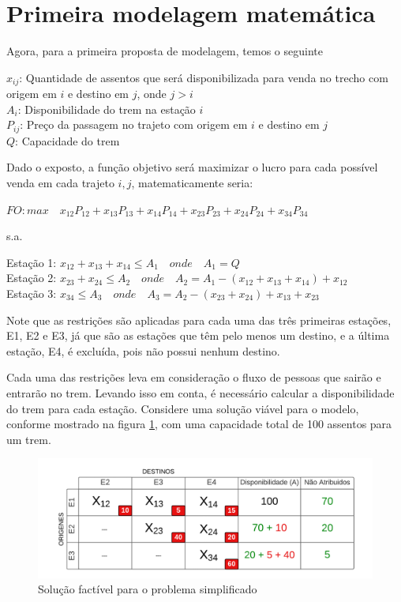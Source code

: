 \section{Primeira modelagem matemática}\label{sec:modelo1}

Agora, para a primeira proposta de modelagem, temos o seguinte

\noindent $x_{ij}$: Quantidade de assentos que será disponibilizada para venda no trecho com origem em $i$ e destino em $j$, onde $j>i$ \\
\noindent $A_i$: Disponibilidade do trem na estação $i$ \\
\noindent $P_{ij}$: Preço da passagem no trajeto com origem em $i$ e destino em $j$ \\
\noindent $Q$: Capacidade do trem

Dado o exposto, a função objetivo será maximizar o lucro para cada possível venda em cada trajeto $i,j$, matematicamente seria:

$FO: max \quad x_{12}P_{12} + x_{13}P_{13} + x_{14}P_{14} + x_{23}P_{23} + x_{24}P_{24} + x_{34}P_{34}$

s.a.

Estação 1: $x_{12} + x_{13} + x_{14} \leq A_1 \quad onde \quad A_1 = Q $ \\
\indent Estação 2: $x_{23} + x_{24}  \leq  A_2 \quad onde \quad A_2 = A_1 - (x_{12} + x_{13} + x_{14}) + x_{12} $ \\
\indent Estação 3: $x_{34} \leq A_3 \quad onde \quad A_3 = A_2 - (x_{23} + x_{24}) + x_{13} + x_{23} $

Note que as restrições são aplicadas para cada uma das três primeiras estações, E1, E2 e E3, já que são as estações que têm pelo menos um destino, e a última estação, E4, é excluída, pois não possui nenhum destino.

Cada uma das restrições leva em consideração o fluxo de pessoas que sairão e entrarão no trem. Levando isso em conta, é necessário calcular a disponibilidade do trem para cada estação. Considere uma solução viável para o modelo, conforme mostrado na figura \ref{fig: fig2}, com uma capacidade total de 100 assentos para um trem.

\begin{figure}[!ht]
	\begin{center}
		\includegraphics[scale=0.4]{img/fig2.png}
		\caption{Solução factível para o problema simplificado}
		\label{fig: fig2}
	\end{center}
\end{figure}

